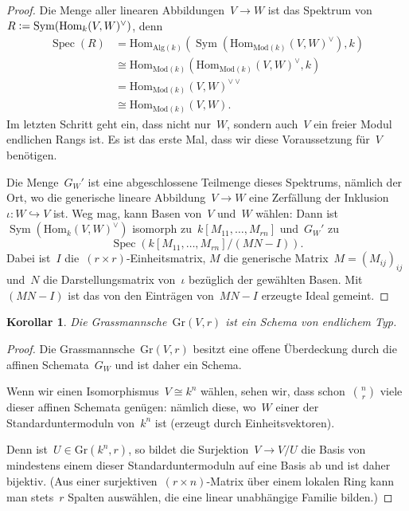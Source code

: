\documentclass[a4paper,ngerman,12pt]{scrartcl}
\theoremstyle{definition}
\theoremstyle{plain}
\newtheorem{cor}[defn]{Korollar}
\theoremstyle{remark}
\newcommand{\Hom}{\mathrm{Hom}}
\DeclareMathOperator{\Spec}{Spec}
\DeclareMathOperator{\Sym}{Sym}
\newcommand{\defeq}{\vcentcolon=}
\newcommand{\Gr}{\mathrm{Gr}}
\begin{document}
\begin{proof}Die Menge aller linearen Abbildungen~$V \to W$ ist das Spektrum
von~$R \defeq \Sym(\Hom_k(V,W)^\vee)$, denn
\begin{align*}
  \Spec(R) &=
  \Hom_{\mathrm{Alg}(k)}(\Sym(\Hom_{\mathrm{Mod}(k)}(V,W)^\vee), k) \\
  &\cong \Hom_{\mathrm{Mod}(k)}(\Hom_{\mathrm{Mod}(k)}(V,W)^\vee, k) \\
  &=\Hom_{\mathrm{Mod}(k)}(V,W)^{\vee\vee} \\
  &\cong \Hom_{\mathrm{Mod}(k)}(V,W).
\end{align*}
Im letzten Schritt geht ein, dass nicht nur~$W$, sondern auch~$V$ ein freier Modul
endlichen Rangs ist. Es ist das erste Mal, dass wir diese Voraussetzung
für~$V$ benötigen.

Die Menge~$G_W'$ ist eine abgeschlossene Teilmenge dieses Spektrums, nämlich
der Ort, wo die generische lineare Abbildung~$V \to W$ eine Zerfällung der
Inklusion~$\iota : W \hookrightarrow V$ ist. Weg mag, kann Basen von~$V$
und~$W$ wählen: Dann ist~$\Sym(\Hom_k(V,W)^\vee)$ isomorph
zu~$k[M_{11},\ldots,M_{rn}]$ und~$G_W'$ zu
\[ \Spec(k[M_{11},\ldots,M_{rn}]/(MN-I)). \]
Dabei ist~$I$ die~$(r \times r)$-Einheitsmatrix, $M$ die generische Matrix~$M =
(M_{ij})_{ij}$ und~$N$ die Darstellungsmatrix von~$\iota$ bezüglich der
gewählten Basen. Mit~$(MN-I)$ ist das von den Einträgen von~$MN-I$ erzeugte
Ideal gemeint.
\end{proof}

\begin{cor}Die Grassmannsche~$\Gr(V,r)$ ist ein Schema von endlichem
Typ.\end{cor}

\begin{proof}Die Grassmannsche~$\Gr(V,r)$ besitzt eine offene
Überdeckung durch die affinen Schemata~$G_W$ und ist daher ein Schema.

Wenn wir einen Isomorphismus~$V \cong k^n$ wählen, sehen wir, dass
schon~$\binom{n}{r}$ viele dieser affinen Schemata genügen: nämlich diese,
wo~$W$ einer der Standarduntermoduln von~$k^n$ ist (erzeugt durch
Einheitsvektoren).

Denn ist~$U \in \Gr(k^n,r)$, so bildet die Surjektion~$V \to V/U$ die Basis von
mindestens einem dieser Standarduntermoduln auf eine Basis ab und ist daher
bijektiv. (Aus einer surjektiven~$(r \times n)$-Matrix über einem lokalen Ring
kann man stets~$r$ Spalten auswählen, die eine linear unabhängige Familie
bilden.)
\end{proof}
\end{document}
